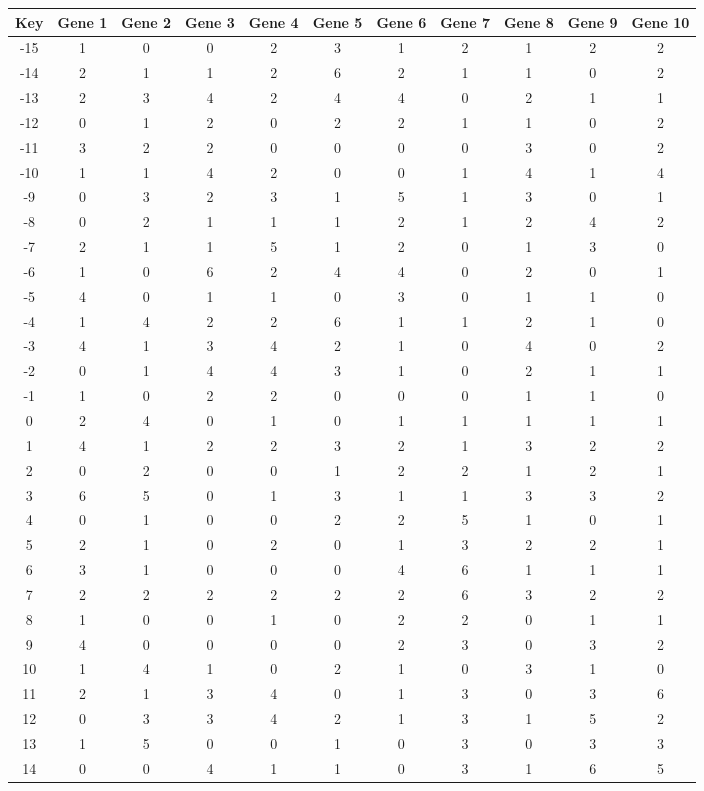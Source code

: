 \begin{tabular}{|c|c|c|c|c|c|c|c|c|c|c|}
\hline
Key & Gene 1 & Gene 2 & Gene 3 & Gene 4 & Gene 5 & Gene 6 & Gene 7 & Gene 8 & Gene 9 & Gene 10 \\
\hline
-15 & 1 & 0 & 0 & 2 & 3 & 1 & 2 & 1 & 2 & 2 \\
-14 & 2 & 1 & 1 & 2 & 6 & 2 & 1 & 1 & 0 & 2 \\
-13 & 2 & 3 & 4 & 2 & 4 & 4 & 0 & 2 & 1 & 1 \\
-12 & 0 & 1 & 2 & 0 & 2 & 2 & 1 & 1 & 0 & 2 \\
-11 & 3 & 2 & 2 & 0 & 0 & 0 & 0 & 3 & 0 & 2 \\
-10 & 1 & 1 & 4 & 2 & 0 & 0 & 1 & 4 & 1 & 4 \\
-9 & 0 & 3 & 2 & 3 & 1 & 5 & 1 & 3 & 0 & 1 \\
-8 & 0 & 2 & 1 & 1 & 1 & 2 & 1 & 2 & 4 & 2 \\
-7 & 2 & 1 & 1 & 5 & 1 & 2 & 0 & 1 & 3 & 0 \\
-6 & 1 & 0 & 6 & 2 & 4 & 4 & 0 & 2 & 0 & 1 \\
-5 & 4 & 0 & 1 & 1 & 0 & 3 & 0 & 1 & 1 & 0 \\
-4 & 1 & 4 & 2 & 2 & 6 & 1 & 1 & 2 & 1 & 0 \\
-3 & 4 & 1 & 3 & 4 & 2 & 1 & 0 & 4 & 0 & 2 \\
-2 & 0 & 1 & 4 & 4 & 3 & 1 & 0 & 2 & 1 & 1 \\
-1 & 1 & 0 & 2 & 2 & 0 & 0 & 0 & 1 & 1 & 0 \\
0 & 2 & 4 & 0 & 1 & 0 & 1 & 1 & 1 & 1 & 1 \\
1 & 4 & 1 & 2 & 2 & 3 & 2 & 1 & 3 & 2 & 2 \\
2 & 0 & 2 & 0 & 0 & 1 & 2 & 2 & 1 & 2 & 1 \\
3 & 6 & 5 & 0 & 1 & 3 & 1 & 1 & 3 & 3 & 2 \\
4 & 0 & 1 & 0 & 0 & 2 & 2 & 5 & 1 & 0 & 1 \\
5 & 2 & 1 & 0 & 2 & 0 & 1 & 3 & 2 & 2 & 1 \\
6 & 3 & 1 & 0 & 0 & 0 & 4 & 6 & 1 & 1 & 1 \\
7 & 2 & 2 & 2 & 2 & 2 & 2 & 6 & 3 & 2 & 2 \\
8 & 1 & 0 & 0 & 1 & 0 & 2 & 2 & 0 & 1 & 1 \\
9 & 4 & 0 & 0 & 0 & 0 & 2 & 3 & 0 & 3 & 2 \\
10 & 1 & 4 & 1 & 0 & 2 & 1 & 0 & 3 & 1 & 0 \\
11 & 2 & 1 & 3 & 4 & 0 & 1 & 3 & 0 & 3 & 6 \\
12 & 0 & 3 & 3 & 4 & 2 & 1 & 3 & 1 & 5 & 2 \\
13 & 1 & 5 & 0 & 0 & 1 & 0 & 3 & 0 & 3 & 3 \\
14 & 0 & 0 & 4 & 1 & 1 & 0 & 3 & 1 & 6 & 5 \\
\hline
\end{tabular}